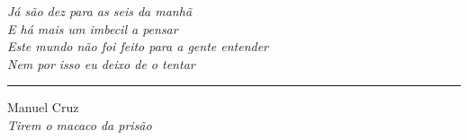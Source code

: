 \begin{flushleft}
    \textit{Já são dez para as seis da manhã        \\
    E há mais um imbecil a pensar                   \\
    Este mundo não foi feito para a gente entender  \\
    Nem por isso eu deixo de o tentar}
    
    \rule[0.5ex]{20.9em}{0.55pt}
    
    Manuel Cruz                                     \\
    \textit{Tirem o macaco da prisão}
\end{flushleft}